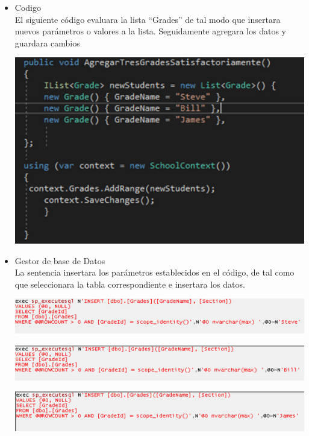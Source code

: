 \begin{itemize}
	\item Codigo
	\\El siguiente código evaluara la lista “Grades” de tal modo que insertara nuevos parámetros o valores a la lista. Seguidamente agregara los datos y guardara cambios

	\begin{center}
	\includegraphics[width=15cm]{./Imagenes/6a} 
	\end{center}

	\item Gestor de base de Datos 
	\\La sentencia insertara los parámetros establecidos en el código, de tal como que seleccionara la tabla correspondiente e insertara los datos.
	\begin{center}
	\includegraphics[width=15cm]{./Imagenes/6b} 
	\end{center}
\begin{center}
	\includegraphics[width=15cm]{./Imagenes/6c} 
	\end{center}
\begin{center}
	\includegraphics[width=15cm]{./Imagenes/6d} 
	\end{center}
	
\end{itemize} 
